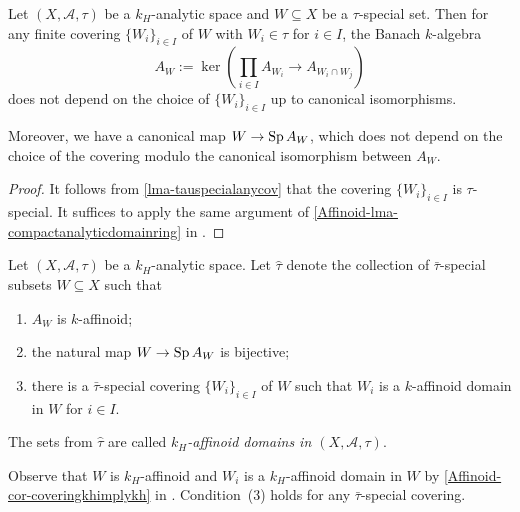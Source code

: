 \begin{lemma}\label{lma-AWspecial}
    Let  $(X,\mathcal{A},\tau)$ be a $k_H$-analytic space and $W\subseteq X$ be a $\tau$-special set. Then for any finite covering $\{W_i\}_{i\in I}$ of $W$ with $W_i\in \tau$ for $i\in I$, the Banach $k$-algebra
    \[
        A_W:=\ker\left(\prod_{i\in I}A_{W_i}\rightarrow A_{W_i\cap W_j}  \right)
    \]
    does not depend on the choice of $\{W_i\}_{i\in I}$ up to canonical isomorphisms.

    Moreover, we have a canonical map $W\rightarrow \operatorname{Sp} A_W$, which does not depend on the choice of the covering modulo the canonical isomorphism between $A_W$.
\end{lemma}
\begin{proof}
    It follows from \cref{lma-tauspecialanycov} that the covering $\{W_i\}_{i\in I}$ is $\tau$-special. It suffices to apply the same argument of \cref{Affinoid-lma-compactanalyticdomainring} in .
\end{proof}

\begin{definition}\label{def-tauhat}
    Let  $(X,\mathcal{A},\tau)$ be a $k_H$-analytic space. Let $\hat{\tau}$ denote the collection of $\bar{\tau}$-special subsets $W\subseteq X$ such that 
    \begin{enumerate}
        \item $A_W$ is $k$-affinoid;
        \item the natural map $W\rightarrow \operatorname{Sp} A_W$ is bijective;
        \item there is a $\bar{\tau}$-special covering $\{W_i\}_{i\in I}$ of $W$ such that $W_i$ is a $k$-affinoid domain in $W$ for $i\in I$.
    \end{enumerate}

    The sets from $\hat{\tau}$ are called \emph{$k_H$-affinoid domains in $(X,\mathcal{A},\tau)$}.
\end{definition}
Observe that $W$ is $k_H$-affinoid and $W_i$ is a $k_H$-affinoid domain in $W$ by \cref{Affinoid-cor-coveringkhimplykh} in . Condition~(3) holds for any $\bar{\tau}$-special covering.




